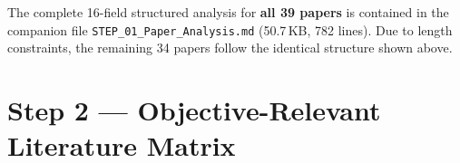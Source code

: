 \documentclass[11pt,a4paper]{article}
\begin{document}
\bigskip
\begin{infobox}
The complete 16-field structured analysis for \textbf{all 39 papers} is contained in the companion file \texttt{STEP\_01\_Paper\_Analysis.md} (50.7\,KB, 782 lines). Due to length constraints, the remaining 34 papers follow the identical structure shown above.
\end{infobox}

\newpage

\section{Step 2 --- Objective-Relevant Literature Matrix}
\label{sec:step2}
\end{document}
